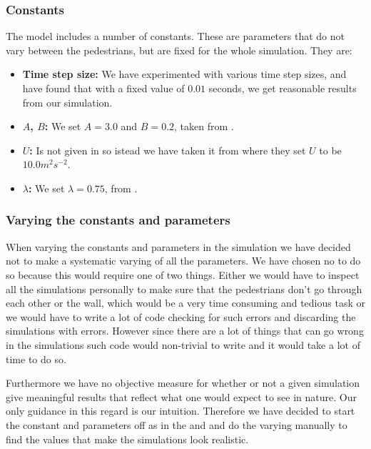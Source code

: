 \subsubsection{Constants} \label{constants}
The model includes a number of constants. These are parameters that do not 
vary between the pedestrians, but are fixed for the whole simulation. They are:

\begin{itemize}
    \item \textbf{Time step size:} We have experimented with various time step 
        sizes, and have found that with a fixed value of $0.01$ seconds, we 
        get reasonable results from our simulation.

    \item \textbf{$A$, $B$:} We set $A=3.0$ and $B=0.2$, taken from  
        \cite{self-org}.

    \item \textbf{$U$:} Is not given in \cite{self-org} so istead we have taken 
 			it from \cite{social-force} where they set $U$ to be $10.0 m^2 s^{-2}$.

    \item \textbf{$\lambda$:} We set $\lambda=0.75$, from 
            \cite{self-org}.
\end{itemize}

\subsubsection{Varying the constants and 
parameters}\label{sec:varying-constants}
When varying the constants and parameters in the simulation we have decided 
not to make a systematic varying of all the parameters. We have chosen no to 
do so because this would require one of two things.  Either we would have to 
inspect all the simulations personally to make sure that the pedestrians don't 
go through each other or the wall, which would be a very time consuming and 
tedious task or we would have to write a lot of code checking for such errors 
and discarding the simulations with errors. However since there are a lot of 
things that can go wrong in the simulations such code would non-trivial to 
write and it would take a lot of time to do so. 

Furthermore we have no objective measure for whether or not a given simulation 
give meaningful results that reflect what one would expect to see in nature. 
Our only guidance in this regard is our intuition. Therefore we have decided 
to start the constant and parameters off as in the \cite{self-org} and 
\cite{ABconstant} and do the varying manually to find the values that make the 
simulations look realistic.


